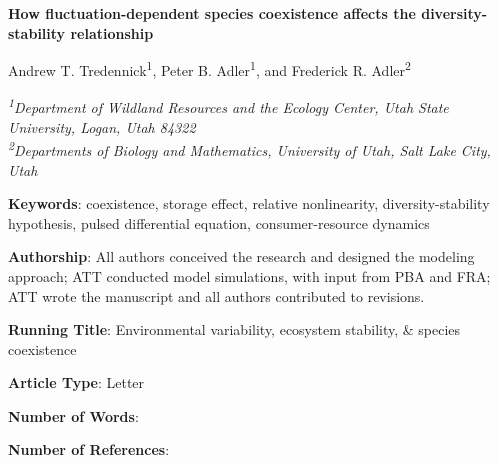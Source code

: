 \documentclass[12pt,]{article}
\title{}
\author{}
\date{}
\begin{document}
\maketitle


\renewcommand\linenumberfont{\normalfont\tiny\sffamily\color{gray}}

\allsectionsfont{\normalfont\sffamily\bfseries}

\begin{singlespace}

\begin{centering}

\textsf{\large{\textbf{How fluctuation-dependent species coexistence affects the diversity-stability relationship}}}



\vspace{2.5em}

\renewcommand*{\thefootnote}{\fnsymbol{footnote}}

Andrew T. Tredennick\textsuperscript{1}, Peter B. Adler\textsuperscript{1}, and Frederick R. Adler\textsuperscript{2}

\vspace{1.5em}

\textit{\small{\textsuperscript{1}Department of Wildland Resources and the Ecology Center, Utah State University, Logan, Utah 84322}} \\
\textit{\small{\textsuperscript{2}Departments of Biology and Mathematics, University of Utah, Salt Lake City, Utah}} 

\end{centering}

\vspace{3em}

\noindent \textbf{Keywords}: coexistence, storage effect, relative nonlinearity, diversity-stability hypothesis, pulsed differential equation, consumer-resource dynamics

\noindent \textbf{Authorship}: All authors conceived the research and designed the modeling approach; ATT conducted model simulations, with input from PBA and FRA; ATT wrote the manuscript and all authors contributed to revisions.

\noindent \textbf{Running Title}: Environmental variability, ecosystem stability, \& species coexistence

\noindent \textbf{Article Type}: Letter

\noindent \textbf{Number of Words}:

\noindent \textbf{Number of References}:


\end{singlespace}
\end{document}
